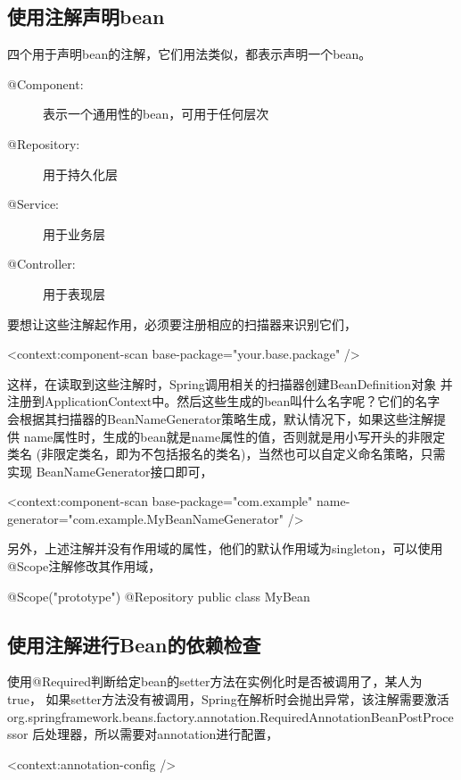 \documentclass[a4paper,11pt]{article}
\begin{document}
\subsection[使用注解创建bean]{使用注解声明bean}
四个用于声明bean的注解，它们用法类似，都表示声明一个bean。
\begin{description}
\item [@Component: ] 表示一个通用性的bean，可用于任何层次
\item [@Repository: ] 用于持久化层
\item [@Service: ] 用于业务层
\item [@Controller: ] 用于表现层
\end{description}
要想让这些注解起作用，必须要注册相应的扫描器来识别它们，

\begin{xmlcode}
<context:component-scan base-package="your.base.package" />
\end{xmlcode}

这样，在读取到这些注解时，Spring调用相关的扫描器创建BeanDefinition对象
并注册到ApplicationContext中。然后这些生成的bean叫什么名字呢？它们的名字
会根据其扫描器的BeanNameGenerator策略生成，默认情况下，如果这些注解提供
name属性时，生成的bean就是name属性的值，否则就是用小写开头的非限定类名
(非限定类名，即为不包括报名的类名)，当然也可以自定义命名策略，只需实现
BeanNameGenerator接口即可，

\begin{xmlcode}
<context:component-scan
  base-package="com.example"
  name-generator="com.example.MyBeanNameGenerator" />
\end{xmlcode}

另外，上述注解并没有作用域的属性，他们的默认作用域为singleton，可以使用
@Scope注解修改其作用域，

\begin{javacode}
  @Scope("prototype")
  @Repository
  public class MyBean { }
\end{javacode}

\subsection[使用注解进行Bean的依赖检查]{使用注解进行Bean的依赖检查}
使用@Required判断给定bean的setter方法在实例化时是否被调用了，某人为true，
如果setter方法没有被调用，Spring在解析时会抛出异常，该注解需要激活
org.springframework.beans.factory.annotation.RequiredAnnotationBeanPostProcessor
后处理器，所以需要对annotation进行配置，

\begin{xmlcode}
  <context:annotation-config />
\end{xmlcode}
\end{document}
